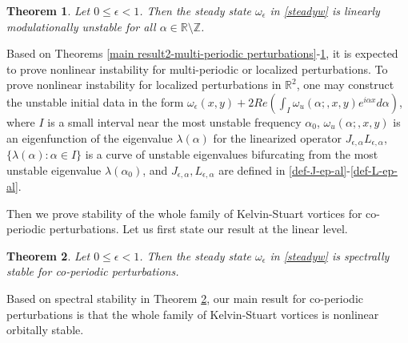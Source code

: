 \documentclass[1 [leqno, 11pt]{amsart}
\numberwithin{equation}{section}
\let\ep=\epsilon
\newtheorem{Theorem}{Theorem}[section]
\begin{document}
\begin{CJK*}{GBK}{song}
\begin{Theorem}\label{main result3-modulation-unstable}
Let $0 \leq \ep < 1$. Then the steady state $\omega_\ep$ in \eqref{steadyw} is linearly modulationally unstable  for all $\alpha\in\mathbb{R}\setminus\mathbb{Z}$.
\end{Theorem}

Based on Theorems \ref{main result2-multi-periodic perturbations}-\ref{main result3-modulation-unstable}, it is expected to prove nonlinear instability for  multi-periodic or localized perturbations. To prove nonlinear instability for  localized perturbations in $\mathbb{R}^2$,
one may construct the unstable initial data in the form
$\omega_\ep(x,y)+2Re(\int_I\omega_u(\alpha;,x,y) e^{i\alpha x}d\alpha)$, where
$I$ is a small interval near the most unstable frequency $\alpha_0$,
 $\omega_u(\alpha;,x,y)$ is an eigenfunction of the eigenvalue $\lambda(\alpha)$ for the linearized operator  $J_{\ep,\alpha} L_{\ep,\alpha}$,
 $\{\lambda(\alpha):\alpha\in I\}$ is a curve of  unstable eigenvalues   bifurcating from the most unstable eigenvalue $\lambda(\alpha_0)$,   and $J_{\ep,\alpha}, L_{\ep,\alpha}$ are defined in \eqref{def-J-ep-al}-\eqref{def-L-ep-al}.





Then we prove  stability of the whole family of Kelvin-Stuart vortices for co-periodic perturbations.  Let us first state
our  result at the linear level.

\begin{Theorem}\label{main result1-co-periodic perturbations}
Let $0 \leq \ep < 1$. Then
the steady state $\omega_\ep$ in \eqref{steadyw} is spectrally stable for co-periodic perturbations.
\end{Theorem}

Based on spectral stability in Theorem \ref{main result1-co-periodic perturbations}, our main result for co-periodic perturbations is  that the whole family of Kelvin-Stuart vortices is nonlinear orbitally stable.


\end{CJK*}
\end{document}

